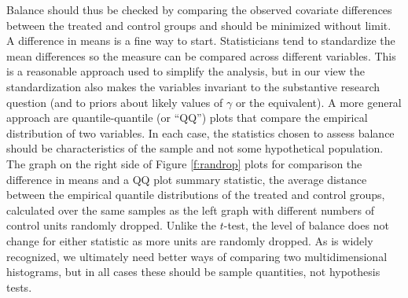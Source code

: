 \documentclass[11pt,titlepage]{article}
\begin{document}
Balance should thus be checked by comparing the observed covariate
differences between the treated and control groups and should be
minimized without limit.  A difference in means is a fine way to
start.  Statisticians tend to standardize the mean differences so the
measure can be compared across different variables.  This is a
reasonable approach used to simplify the analysis, but in our view the
standardization also makes the variables invariant to the substantive
research question (and to priors about likely values of $\gamma$ or
the equivalent).  A more general approach are quantile-quantile (or
``QQ'') plots that compare the empirical distribution of two
variables.  In each case, the statistics chosen to assess balance
should be characteristics of the sample and not some hypothetical
population.  The graph on the right side of Figure \ref{f:randrop}
plots for comparison the difference in means and a QQ plot summary
statistic, the average distance between the empirical quantile
distributions of the treated and control groups, calculated over the
same samples as the left graph with different numbers of control units
randomly dropped.  Unlike the $t$-test, the level of balance does not
change for either statistic as more units are randomly dropped.  As is
widely recognized, we ultimately need better ways of comparing two
multidimensional histograms, but in all cases these should be sample
quantities, not hypothesis tests.




\end{document}
